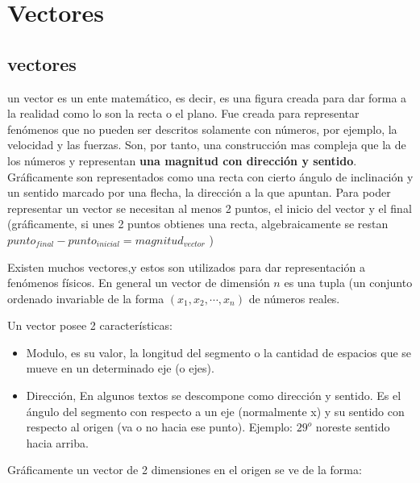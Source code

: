 
\section{Vectores}

\subsection{vectores}

 un vector es un ente matemático, es decir, es una figura creada para dar
    forma a la realidad como lo son la recta o el plano. Fue creada para
    representar fenómenos que no pueden ser descritos solamente con números, por
    ejemplo, la velocidad y las fuerzas. Son, por tanto, una construcción
    mas compleja que  la de los números y representan \textbf{una magnitud con
    dirección y sentido}. Gráficamente son representados como una recta con
    cierto ángulo de inclinación y un sentido marcado por una flecha, la
    dirección a la que apuntan.  Para poder representar un vector se necesitan
    al menos 2 puntos, el inicio del vector y el final (gráficamente, si unes 2
    puntos obtienes una recta, algebraicamente se restan $punto_{final}-
    punto_{inicial}=magnitud_{vector}$ )

    Existen muchos vectores,y estos son utilizados para dar representación a
    fenómenos físicos. En general un vector de dimensión $n$ es una tupla (un
    conjunto ordenado invariable de la forma $(x_1,x_2,\cdots,x_n)$ de números
    reales.

    Un vector posee 2 características:

    \begin{itemize} \item Modulo, es su valor, la longitud del segmento o la
                cantidad de espacios que se mueve en un determinado eje (o
                ejes).

        \item Dirección, En algunos textos se descompone como dirección y
            sentido.  Es el ángulo del segmento con respecto a un eje
            (normalmente x) y su sentido con respecto al origen (va o no hacia
            ese punto). Ejemplo: $29^o$ noreste sentido hacia arriba.
    \end{itemize}

    Gráficamente un vector de 2 dimensiones en el origen se ve de la forma:


